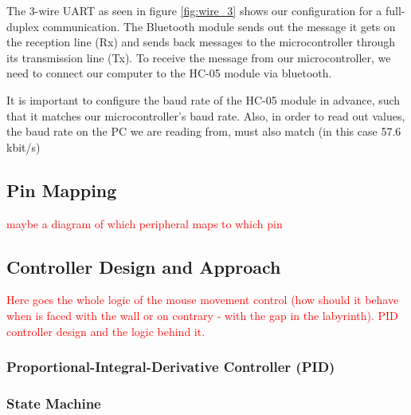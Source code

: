 The 3-wire UART as seen in figure \ref{fig:wire_3} shows our configuration for a full-duplex communication. The Bluetooth module sends out the message it gets on the reception line (Rx) and sends back messages to the microcontroller through its transmission line (Tx). To receive the message from our microcontroller, we need to connect our computer to the HC-05 module via bluetooth.

It is important to configure the baud rate of the HC-05 module in advance, such that it matches our microcontroller's baud rate. Also, in order to read out values, the baud rate on the PC we are reading from, must also match (in this case 57.6 kbit/s)

\subsection{Pin Mapping}
\textcolor{red}{
maybe a diagram of which peripheral maps to which pin
}


\subsection{Controller Design and Approach}

\textcolor{red}{
Here goes the whole logic of the mouse movement control (how should it behave when is faced with the wall or on contrary - with the gap in the labyrinth). PID controller design and the logic behind it.
}

\subsubsection{Proportional-Integral-Derivative Controller (PID)}

\subsubsection{State Machine}



